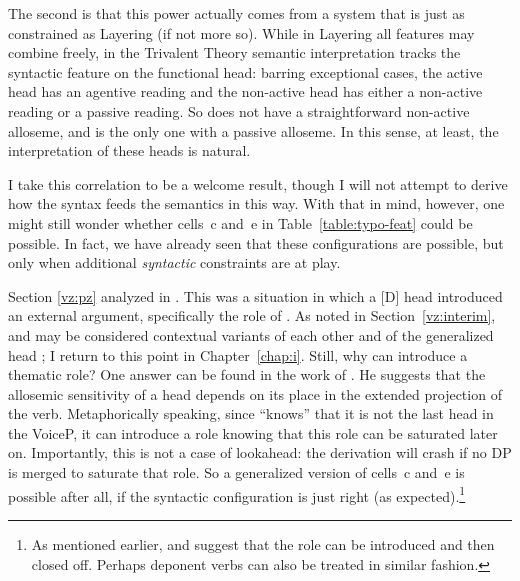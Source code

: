 \begin{exe}
\begin{xlist}
\begin{exe}
\begin{exe}
\begin{xlist}
\begin{exe}
\begin{exe}
\begin{exe}
\begin{exe}
\begin{exe}
\begin{xlist}
\label{r1:6:2}The second is that this power actually comes from a system that is just as constrained as Layering (if not more so). While in Layering all features may combine freely, in the Trivalent Theory semantic interpretation tracks the syntactic feature on the functional head: barring exceptional cases, the active head {\vd} has an agentive reading and the non-active head {\vz} has either a non-active reading or a passive reading. So {\vd} does not have a straightforward non-active alloseme, and {\vz} is the only one with a passive alloseme. In this sense, at least, the interpretation of these heads is natural.

I take this correlation to be a welcome result, though I will not attempt to derive how the syntax feeds the semantics in this way. With that in mind, however, one might still wonder whether cells~c and~e in Table~\ref{table:typo-feat} could be possible. In fact, we have already seen that these configurations are possible, but only when additional \emph{syntactic} constraints are at play.

Section \ref{vz:pz} analyzed  in {\tnif}. This was a situation in which a [\textminus{}D] head introduced an external argument, specifically the  role of {\pz}. As noted in Section~\ref{vz:interim}, {\pz} and {\vz} may be considered contextual variants of each other and of the generalized head \emph{}; I return to this point in Chapter~\ref{chap:i}. Still, why can {\pz} introduce a thematic role? One answer can be found in the work of \cite{wood15springer}. He suggests that the allosemic sensitivity of a head depends on its place in the extended projection of the verb. Metaphorically speaking, since {\pz} ``knows'' that it is not the last head in the VoiceP, it can introduce a  role knowing that this role can be saturated later on. Importantly, this is not a case of lookahead: the derivation will crash if no DP is merged to saturate that role. So a generalized version of cells~c and~e is possible after all, if the syntactic configuration is just right (as expected).\footnote{As mentioned earlier, \cite{legate14} and \cite{akkus19jl} suggest that the  role can be introduced and then closed off. Perhaps deponent verbs can also be treated in similar fashion.}


\end{xlist}
\end{exe}
\end{exe}
\end{exe}
\end{exe}
\end{exe}
\end{xlist}
\end{exe}
\end{exe}
\end{xlist}
\end{exe}
